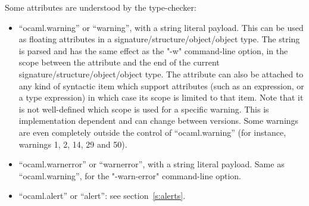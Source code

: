 Some attributes are understood by the type-checker:
\begin{itemize}
\item
 ``ocaml.warning'' or ``warning'', with a string literal payload.
 This can be used as floating attributes in a
 signature/structure/object/object type.  The string is parsed and has
 the same effect as the "-w" command-line option, in the scope between
 the attribute and the end of the current
 signature/structure/object/object type.  The attribute can also be
 attached to any kind of syntactic item which support attributes
 (such as an expression, or a type expression)
 in which case its scope is limited to that item.
 Note that it is not well-defined which scope is used for a specific
 warning.  This is implementation dependent and can change between versions.
 Some warnings are even completely outside the control of ``ocaml.warning''
 (for instance, warnings 1, 2, 14, 29 and 50).

\item
 ``ocaml.warnerror'' or ``warnerror'', with a string literal payload.
 Same as ``ocaml.warning'', for the "-warn-error" command-line option.

\item
 ``ocaml.alert'' or ``alert'': see section~\ref{s:alerts}.


\end{itemize}
